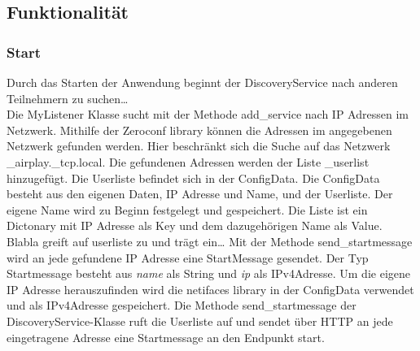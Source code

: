 \subsection{Funktionalität}
\subsubsection{Start}
Durch das Starten der Anwendung beginnt der DiscoveryService nach anderen Teilnehmern zu suchen\dots
\\
Die MyListener Klasse sucht mit der Methode add\_service nach IP Adressen im Netzwerk. Mithilfe der Zeroconf library können die Adressen im angegebenen Netzwerk gefunden werden.
Hier beschränkt sich die Suche auf das Netzwerk \_airplay.\_tcp.local. Die gefundenen Adressen werden der Liste \_userlist hinzugefügt. 
Die Userliste befindet sich in der ConfigData. Die ConfigData besteht aus den eigenen Daten, IP Adresse und Name, und der Userliste. 
Der eigene Name wird zu Beginn festgelegt und gespeichert.
Die Liste ist ein Dictonary mit IP Adresse als Key und dem dazugehörigen Name als Value.
Blabla greift auf userliste zu und trägt ein\dots
Mit der Methode send\_startmessage wird an jede gefundene IP Adresse eine StartMessage gesendet. Der Typ Startmessage besteht aus \emph{name} als String und \emph{ip} als IPv4Adresse.
Um die eigene IP Adresse herauszufinden wird die netifaces library in der ConfigData verwendet und als IPv4Adresse gespeichert. 
Die Methode send\_startmessage der DiscoveryService-Klasse ruft die Userliste auf und sendet über HTTP an jede eingetragene Adresse eine Startmessage an den Endpunkt start.

